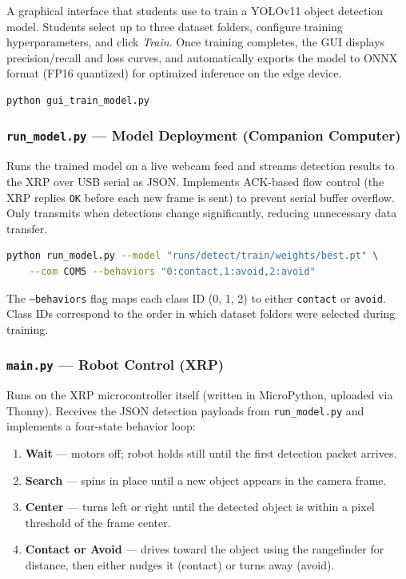 \documentclass[11pt,a4paper]{article}
\begin{document}
A graphical interface that students use to train a YOLOv11 object detection model. Students select up to three dataset folders, configure training hyperparameters, and click \textit{Train}. Once training completes, the GUI displays precision/recall and loss curves, and automatically exports the model to ONNX format (FP16 quantized) for optimized inference on the edge device.

\begin{lstlisting}[language=bash, caption={Launching the training GUI}]
python gui_train_model.py
\end{lstlisting}

\subsubsection*{\texttt{run\_model.py} — Model Deployment (Companion Computer)}

Runs the trained model on a live webcam feed and streams detection results to the XRP over USB serial as JSON. Implements ACK-based flow control (the XRP replies \texttt{OK} before each new frame is sent) to prevent serial buffer overflow. Only transmits when detections change significantly, reducing unnecessary data transfer.

\begin{lstlisting}[language=bash, caption={Running the detection script}]
python run_model.py --model "runs/detect/train/weights/best.pt" \
    --com COM5 --behaviors "0:contact,1:avoid,2:avoid"
\end{lstlisting}

The \texttt{--behaviors} flag maps each class ID (0, 1, 2) to either \texttt{contact} or \texttt{avoid}. Class IDs correspond to the order in which dataset folders were selected during training.

\subsubsection*{\texttt{main.py} — Robot Control (XRP)}

Runs on the XRP microcontroller itself (written in MicroPython, uploaded via Thonny). Receives the JSON detection payloads from \texttt{run\_model.py} and implements a four-state behavior loop:

\begin{enumerate}
    \item \textbf{Wait} — motors off; robot holds still until the first detection packet arrives.
    \item \textbf{Search} — spins in place until a new object appears in the camera frame.
    \item \textbf{Center} — turns left or right until the detected object is within a pixel threshold of the frame center.
    \item \textbf{Contact or Avoid} — drives toward the object using the rangefinder for distance, then either nudges it (contact) or turns away (avoid).
\end{enumerate}
\end{document}

